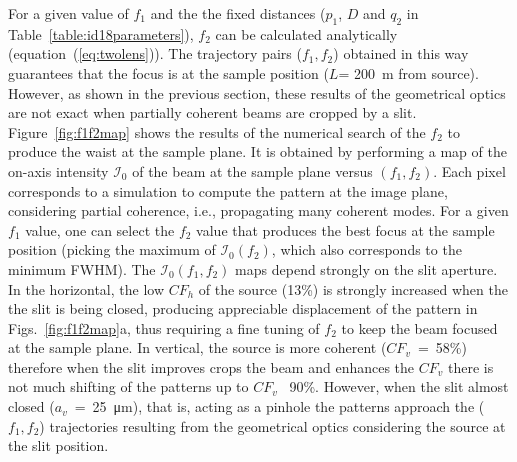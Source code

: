 \documentclass[9pt,twocolumn,twoside]{osajnl}
\begin{document}
For a given value of $f_1$ and the the fixed distances ($p_1$, $D$ and $q_2$ in Table~\ref{table:id18parameters}), $f_2$ can be calculated analytically (equation~(\ref{eq:twolens})). The trajectory pairs ($f_1,f_2$) obtained in this way  
guarantees that the focus is at the sample position ($L$= \SI{200}{\meter} from source). However, as shown in the previous section, these results of the geometrical optics are not exact when partially coherent beams are cropped by a slit. 
Figure~\ref{fig:f1f2map} shows the results of the numerical search of the $f_2$ to produce the waist at the sample plane. It is obtained by performing a map of the on-axis intensity $\mathcal{I}_0$ of the beam at the sample plane versus $(f_1,f_2)$. Each pixel corresponds to a simulation to compute the pattern at the image plane, considering partial coherence, i.e., propagating many coherent modes. For a given $f_1$ value, one can select the $f_2$ value that produces the best focus at the sample position (picking the maximum of $\mathcal{I}_0(f_2)$, which also corresponds to the minimum FWHM). 
The $\mathcal{I}_0(f_1,f_2)$ maps depend strongly on the slit aperture. In the horizontal, the low $CF_h$ of the source (13\%) is strongly increased when the the slit is being closed, producing appreciable displacement of the pattern in Figs.~\ref{fig:f1f2map}a, thus requiring a fine tuning of $f_2$ to keep the beam focused at the sample plane. In vertical, the source is more coherent ($CF_v$~=~58\%) therefore when the slit improves crops the beam and enhances the $CF_v$ there is not much shifting of the patterns up to $CF_v$~ 90\%. However, when the slit almost closed ($a_v$~=~\SI{25}{\micro\meter}), that is, acting as a pinhole the patterns approach the ($f_1,f_2$) trajectories resulting from the geometrical optics considering the source at the slit position.




\end{document}
